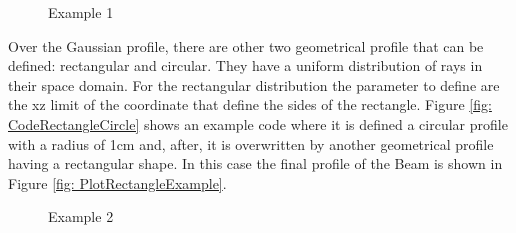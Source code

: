 \begin{figure}[H]
%
\centering
%
\quad
%
%
\caption{Example 1}
\label{fig :p1}
%
\end{figure}
Over the Gaussian profile, there are other two geometrical profile that can be defined: rectangular and circular. They have a uniform distribution of rays in their space domain. For the rectangular distribution the parameter to define are the xz limit of the coordinate that define the sides of the rectangle. Figure \ref{fig: CodeRectangleCircle} shows an example code where it is defined a circular profile with a radius of 1cm and, after, it is overwritten by another geometrical profile having a rectangular shape. In this case the final profile of the Beam is shown in Figure \ref{fig: PlotRectangleExample}.
%
\begin{figure}[H]
%
\centering
%
\quad
%
%
\caption{Example 2}
\label{fig :p2}
\end{figure}
